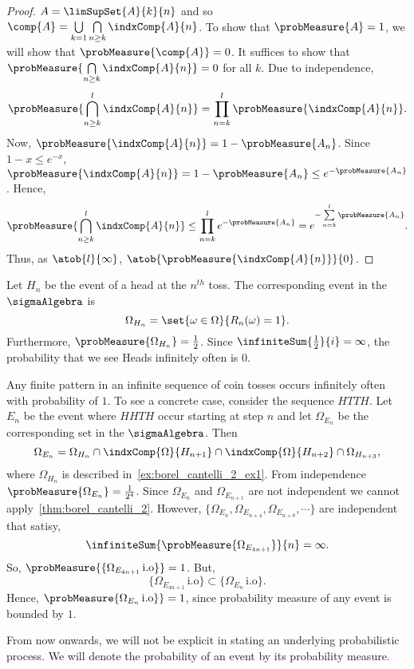 \begin{proof}
    $A = \limSupSet{A}{k}{n}$ and so $\comp{A} = \bigcup\limits_{k=1}\bigcap\limits_{n\geq k}\indxComp{A}{n}$.
    To show that $\probMeasure{A} = 1$, we will show that 
    $\probMeasure{\comp{A}} = 0$. It suffices to show that 
    $\probMeasure{\bigcap\limits_{n\geq k}\indxComp{A}{n}} = 0$ for all $k$. Due to independence,
    \[\probMeasure{\bigcap\limits_{n\geq k}^{l}\indxComp{A}{n}} =
	\prod\limits_{n=k}^{l}\probMeasure{\indxComp{A}{n}}.\]
    Now, $\probMeasure{\indxComp{A}{n}} = 1 - \probMeasure{A_n}$. Since $1-x\leq e^{-x}$,
    $\probMeasure{\indxComp{A}{n}} = 1 - \probMeasure{A_n} \leq e^{-\probMeasure{A_n}}$. Hence,
    \[\probMeasure{\bigcap\limits_{n\geq k}^{l}\indxComp{A}{n}} \leq
	\prod\limits_{n=k}^{l}e^{-\probMeasure{A_n}} = e^{-\sum\limits_{n=k}^{l}\probMeasure{A_n}}.\]
    Thus, as $\atob{l}{\infty}$, $\atob{\probMeasure{\indxComp{A}{n}}}{0}$.
\end{proof}
\begin{Example}\label{ex:borel_cantelli_2_ex1}
    Let $H_n$ be the event of a head at the $n^{th}$ toss. The corresponding event in the $\sigmaAlgebra$
    is\[\Omega_{H_n} = \set{\omega\in\Omega}{R_n(\omega) = 1}.\]
    Furthermore, $\probMeasure{\Omega_{H_n}} = \frac{1}{2}$. Since $\infiniteSum{\frac{1}{2}}{i} = \infty$,
    the probability that we see Heads infinitely often is $0$.
\end{Example}
\begin{Example}
    Any finite pattern in an infinite sequence of coin tosses occurs infinitely often with probability of $1$.
    To see a concrete case, consider the sequence $HTTH$. Let $E_n$ be the event where $HHTH$ occur starting
    at step $n$ and let $\Omega_{E_n}$ be the corresponding set in the $\sigmaAlgebra$. Then 
    \[\Omega_{E_n} = \Omega_{H_n}\cap\indxComp{\Omega}{H_{n+1}}
	\cap\indxComp{\Omega}{H_{n+2}}\cap\Omega_{H_{n+3}},\]
    where $\Omega_{H_n}$ is described in~\ref{ex:borel_cantelli_2_ex1}. From independence 
    $\probMeasure{\Omega_{E_n}} = \frac{1}{2^4}$.
    Since $\Omega_{E_n}$ and $\Omega_{E_{n+1}}$ are not independent we cannot
    apply~\ref{thm:borel_cantelli_2}. However, $\lbrace \Omega_{E_n},
    \Omega_{E_{n+4}},\Omega_{E_{n+8}},\cdots\rbrace$ are independent that satisy,
    \[\infiniteSum{\probMeasure{\Omega_{E_{4n+1}}}}{n} = \infty.\]
    So, $\probMeasure{\lbrace \Omega_{E_{4n+1}}\,\text{i.o} \rbrace } = 1$. But,
    \[\lbrace \Omega_{E_{4n+1}}\,\text{i.o} \rbrace \subset 
	\lbrace \Omega_{E_{n}}\,\text{i.o} \rbrace.\]
    Hence, $\probMeasure{\Omega_{E_{n}}\,\text{i.o} \rbrace} = 1$, since probability measure of any event
    is bounded by $1$.
\end{Example}
From now onwards, we will not be explicit in stating an underlying probabilistic process. We will denote the
probability of an event by its probability measure.
